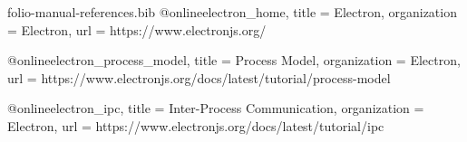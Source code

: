 \begin{filecontents*}{folio-manual-references.bib}
@online{electron_home,
  title        = {Electron},
  organization = {Electron},
  url          = {https://www.electronjs.org/}
}

@online{electron_process_model,
  title        = {Process Model},
  organization = {Electron},
  url          = {https://www.electronjs.org/docs/latest/tutorial/process-model}
}

@online{electron_ipc,
  title        = {Inter-Process Communication},
  organization = {Electron},
  url          = {https://www.electronjs.org/docs/latest/tutorial/ipc}
}
\end{filecontents*}

\documentclass[12pt,a4paper]{report}
\usepackage[utf8]{inputenc}
\usepackage[spanish]{babel}
\usepackage[usenames, dvipsnames]{color}
\usepackage[top=0.70in, bottom=0.70in, left=0.8in,right=0.80in]{geometry}
\usepackage[pdftex]{graphicx}
\usepackage[bookmarks,  colorlinks=false]{hyperref}
\usepackage[final]{pdfpages}
\usepackage{float}
\usepackage[]{apacite}
\usepackage{pslatex}
\usepackage{array}
\usepackage{setspace}
\usepackage{float}
\usepackage{enumerate}
\usepackage{longtable}
\usepackage{amssymb}
\usepackage[font=small,labelfont=bf]{caption}
\def\figurename{\textbf{Figura }}
\usepackage{listings}
\usepackage{fancyhdr}
\pagestyle{fancy}


\cfoot{}
\fancyfoot[RO, RE]{\thepage}
\renewcommand{\headrulewidth}{0.4pt}
\renewcommand{\footrulewidth}{0.4pt}
\usepackage{pgf}
\usepackage{pgfpages}



\renewcommand\bibname{Referencias bibliográficas}
\lhead{ }



